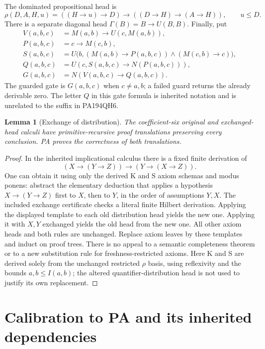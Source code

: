\documentclass[11pt,letterpaper]{article}
\newtheorem{lemma}[theorem]{Lemma}
\begin{document}
The dominated propositional head is
\[
 \rho(D,A,H,u)=((H\to u)\to D)\to((D\to H)\to(A\to H)),
 \qquad u\le D.
\]
There is a separate diagonal head \(\Gamma(B)=B\to U(B,B)\).
Finally, put
\begin{align*}
 V(a,b,c)&=M(a,b)\to U(c,M(a,b)),\\
 P(a,b,c)&=c\to M(c,b),\\
 S(a,b,c)&=U\bigl(b,(M(a,b)\to P(a,b,c))\wedge(M(c,b)\to c)\bigr),\\
 Q(a,b,c)&=U(c,S(a,b,c)\to N(P(a,b,c))),\\
 G(a,b,c)&=N(V(a,b,c)\to Q(a,b,c)).
\end{align*}
The guarded gate is \(G(a,b,c)\) when \(c\ne a,b\); a failed guard
returns the already derivable zero. The letter \(Q\) in this gate formula
is inherited notation and is unrelated to the suffix in PA194QH6.

\begin{lemma}[Exchange of distribution]\label{lem:exchange}
The coefficient-six original and exchanged-head calculi have
primitive-recursive proof translations preserving every conclusion. PA
proves the correctness of both translations.
\end{lemma}
\begin{proof}
In the inherited implicational calculus there is a fixed finite derivation
of
\[
 (X\to(Y\to Z))\to(Y\to(X\to Z)).
\]
One can obtain it using only the derived K and S axiom schemas and modus
ponens: abstract the elementary deduction that applies a hypothesis
\(X\to(Y\to Z)\) first to \(X\), then to \(Y\), in the order of
assumptions \(Y,X\). The included exchange certificate checks a literal
finite Hilbert derivation. Applying the displayed template to each old
distribution head yields the new one. Applying it with \(X,Y\) exchanged
yields the old head from the new one. All other axiom heads and both rules
are unchanged. Replace axiom leaves by these templates and induct on proof
trees. There is no appeal to a semantic completeness theorem or to a new
substitution rule for freshness-restricted axioms.
Here K and S are derived solely from the unchanged restricted \(\rho\)
basis, using reflexivity and the bounds \(a,b\le I(a,b)\); the altered
quantifier-distribution head is not used to justify its own replacement.
\end{proof}

\section{Calibration to PA and its inherited dependencies}\label{sec:pa}
\end{document}
